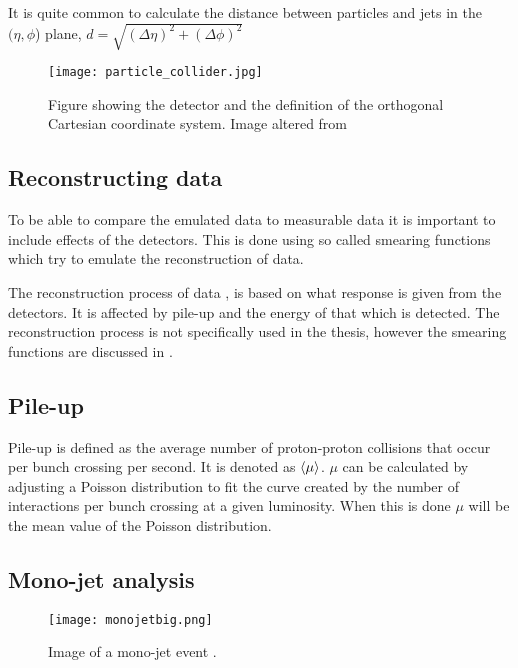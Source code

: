 It is quite common to calculate the distance between particles and jets in the $(\eta,\phi$) plane, $d=\sqrt{(\Delta \eta)^2 + (\Delta \phi)^2}$  

\begin{figure}[ht]
\begin{center}
\texttt{[image: particle\_collider.jpg]}
\caption{Figure showing the \abbrATLAS detector and the definition of the orthogonal Cartesian coordinate system. Image altered from\citep{coordimage}}
\label{fig:coordinatesystem}
\end{center}
\end{figure}

\subsection{Reconstructing data}\label{sec:eo:subsec:reco}
To be able to compare the emulated data to measurable data it is important to include effects of the detectors. This is done using so called smearing functions which try to emulate the reconstruction of data. 

The reconstruction process of data \citep{1129811}, is based on what response is given from the detectors. It is affected by pile-up and the energy of that which is detected. 
The reconstruction process is not specifically used in the thesis, however the smearing functions are discussed in .

\subsection{Pile-up}\label{sec:eo:subsec:pile}

Pile-up is defined as the average number of proton-proton collisions that occur per bunch crossing per second. It is denoted as $\left<\mu\right>$. $\mu$ can be calculated by adjusting a Poisson distribution to fit the curve created by the number of interactions per bunch crossing at a given luminosity. When this is done $\mu$ will be the mean value of the Poisson distribution.


\subsection{Mono-jet analysis}\label{sec:eo:subsec:mjet}

\begin{figure}[ht]
\texttt{[image: monojetbig.png]}
\caption{Image of a mono-jet event \citep{monojet}.}
\label{fig:monojet}
\end{figure}

